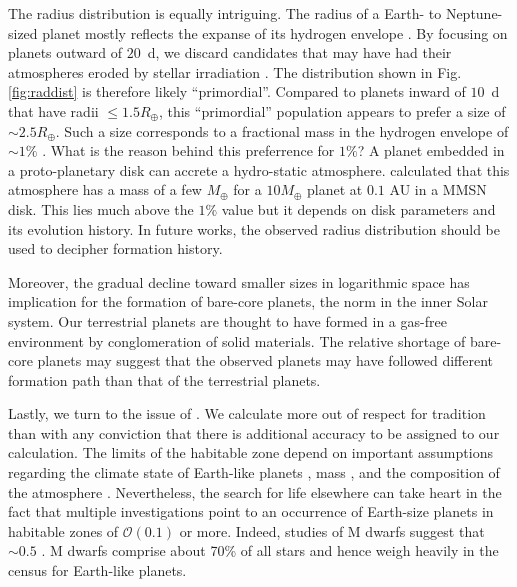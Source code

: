 The radius distribution is equally intriguing. The radius of a Earth- to Neptune-sized
planet mostly reflects the expanse of its hydrogen envelope \citep{Wolfgang2014}.  By
focusing on planets outward of $20$~d, we discard candidates that
may have had their atmospheres eroded by stellar irradiation \citet{Owen2013}. The
distribution shown in Fig.\ref{fig:raddist} is therefore likely
``primordial''. Compared to planets inward of $10$~d that have radii
$\leq 1.5 R_\oplus$, this ``primordial'' population appears to prefer a 
size of $\sim 2.5R_\oplus$. Such a size corresponds to a fractional mass in the
hydrogen envelope of $\sim 1\%$ \citep[assuming a rocky core roughly 
in the $10M_{\oplus}$ range, see, e.g.][]{WuLithwick}. What
is the reason behind this preferrence for $1\%$? A planet embedded in
a proto-planetary disk can accrete a hydro-static
atmosphere. \citet{Rafikov} calculated that this atmosphere has a mass
of a few $M_\oplus$ for a $10 M_\oplus$ planet at $0.1$ AU in a MMSN
disk. This lies much above the $1\%$ value but it depends on disk
parameters and its evolution history.  In future works, the observed
radius distribution should be used to decipher formation history.

Moreover, the gradual decline toward smaller
sizes in logarithmic space has implication for the formation of
bare-core planets, the norm in the inner Solar
system. Our terrestrial planets are thought to have formed in a
gas-free environment by conglomeration of solid materials. The
relative shortage of bare-core planets may suggest that the 
observed \kep{} planets may have followed different formation path 
than that of the terrestrial planets.

Lastly, we turn to the issue of \ee{}. We calculate \ee{} more out of
respect for tradition than with any conviction that there is
additional accuracy to be assigned to our calculation.  The limits of
the habitable zone depend on important assumptions regarding the
climate state of Earth-like planets \citep{Kopparapu2013a}, mass
\citep{Kopparapu2014}, and the composition of the atmosphere
\citep{Pierrehumbert2011}.  Nevertheless, the search for life
elsewhere can take heart in the fact that multiple investigations
point to an occurrence of Earth-size planets in habitable zones of
$\mathcal{O}(0.1)$ or more.  Indeed, studies of M dwarfs suggest that
\ee{} $\sim 0.5$ \citep{Bonfils2013,Kopparapu2013b,Gaidos2013}.  M
dwarfs comprise about 70\% of all stars and hence weigh heavily in the
census for Earth-like planets.


